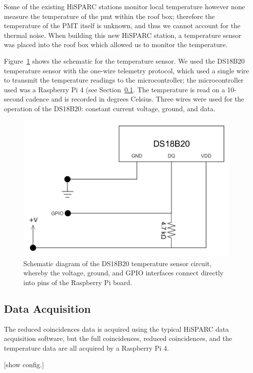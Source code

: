 Some of the existing HiSPARC stations monitor local temperature however none measure the temperature of the \gls{pmt} within the roof box; therefore the temperature of the PMT itself is unknown, and thus we cannot account for the thermal noise. When building this new HiSPARC station, a temperature sensor was placed into the roof box which allowed us to monitor the temperature.

Figure~\ref{fig:temperature_sensor_circuit} shows the schematic for the temperature sensor. We used the DS18B20 temperature sensor with the one-wire telemetry protocol, which used a single wire to transmit the temperature readings to the microcontroller; the microcontroller used was a Raspberry Pi 4 (see Section~\ref{sec:HS14008_data_acqusition}. The temperature is read on a 10-second cadence and is recorded in degrees Celsius. Three wires were used for the operation of the DS18B20: constant current voltage, ground, and data.

\begin{figure}
	\centering
	\includegraphics[width=0.6\columnwidth]{HS_14008_temp_circuit.png}
	\caption{Schematic diagram of the DS18B20 temperature sensor circuit, whereby the voltage, ground, and GPIO interfaces connect directly into pins of the Raspberry Pi board.}
	\label{fig:temperature_sensor_circuit}
\end{figure}




\subsection{Data Acquisition}
\label{sec:HS14008_data_acqusition}

The reduced coincidences data is acquired using the typical HiSPARC data acquisition software, but the full coincidences, reduced coincidences, and the temperature data are all acquired by a Raspberry Pi 4.

[show config.]

